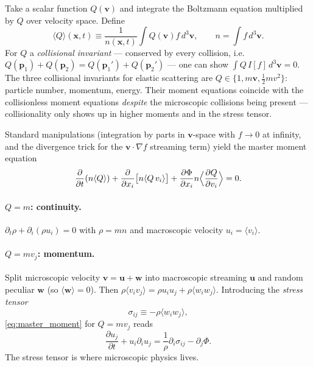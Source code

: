 \documentclass[12pt]{article}
\renewcommand{\vec}[1]{\bm{#1}}
\begin{document}
Take a scalar function $Q(\vec v)$ and integrate the Boltzmann
equation multiplied by $Q$ over velocity space.  Define
%
\begin{equation}
  \langle Q\rangle(\vec x, t) \equiv \frac{1}{n(\vec x,t)}\!\int Q(\vec v) f\,d^3\vec v,
  \qquad
  n = \!\int f\,d^3\vec v.
\end{equation}
%
For $Q$ a \emph{collisional invariant} --- conserved by every
collision, i.e.\ $Q(\vec p_1) + Q(\vec p_2) = Q(\vec p_1') + Q(\vec
p_2')$ --- one can show $\int Q\,I[f]\,d^3\vec v = 0$.  The three
collisional invariants for elastic scattering are
$Q\in\{1,m\vec v,\tfrac{1}{2}mv^2\}$: particle number, momentum,
energy.  Their moment equations coincide with the collisionless
moment equations \emph{despite} the microscopic collisions being
present --- collisionality only shows up in higher moments and in the
stress tensor.

Standard manipulations (integration by parts in $\vec v$-space with
$f\to 0$ at infinity, and the divergence trick for the
$\vec v\cdot\nabla f$ streaming term) yield the master moment equation
%
\begin{equation}
  \frac{\partial}{\partial t}(n\langle Q\rangle)
   + \frac{\partial}{\partial x_i}
     \bigl[n\langle Q\,v_i\rangle\bigr]
   + \frac{\partial\Phi}{\partial x_i}
     n\Bigl\langle\frac{\partial Q}{\partial v_i}\Bigr\rangle = 0.
  \label{eq:master_moment}
\end{equation}

\paragraph{$Q=m$: continuity.}
$\partial_t\rho + \partial_i(\rho u_i) = 0$
with $\rho = mn$ and macroscopic velocity $u_i = \langle v_i\rangle$.

\paragraph{$Q=mv_j$: momentum.}  Split microscopic velocity
$\vec v = \vec u + \vec w$ into macroscopic streaming $\vec u$ and
random peculiar $\vec w$ (so $\langle\vec w\rangle = 0$).  Then
$\rho\langle v_i v_j\rangle = \rho u_i u_j + \rho\langle w_i w_j\rangle$.
Introducing the \emph{stress tensor}
%
\begin{equation}
  \sigma_{ij} \equiv -\rho\langle w_i w_j\rangle,
  \label{eq:stress_general}
\end{equation}
%
\eqref{eq:master_moment} for $Q=mv_j$ reads
%
\begin{equation}
  \frac{\partial u_j}{\partial t} + u_i\partial_i u_j
    = \frac{1}{\rho}\partial_i\sigma_{ij} - \partial_j\Phi.
  \label{eq:momentum_equation}
\end{equation}
%
The stress tensor is where microscopic physics lives.
\end{document}
